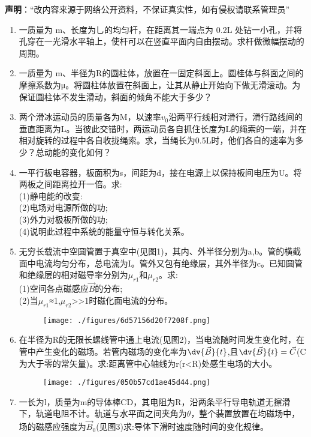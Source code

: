


\textbf{声明}：“改内容来源于网络公开资料，不保证真实性，如有侵权请联系管理员”

\begin{enumerate}
\item 一质量为 m、长度为乚的均匀杆，在距离其一端点为 0.2L 处钻一小孔，并将孔穿在一光滑水平轴上，使杆可以在竖直平面内自由摆动。求杆做微幅摆动的周期。
\item 一质量为 m、半径为R的圆柱体，放置在一固定斜面上。圆桂体与斜面之间的摩擦系数为μ。将圆柱体放置在斜面上，让其从静止开始向下做无滑滚动。为保证圆柱体不发生滑动，斜面的倾角不能大于多少？
\item 两个滑冰运动员的质量各为M，以速率$v_0$沿两平行线相对滑行，滑行路线间的垂直距离为L。当彼此交错时，两运动员各自抓住长度为L的绳索的一端，并在相对旋转的过程中各自收拢绳索。求，当绳长为0.5L时，他们各自的速率为多少？总动能的变化如何？
\item 一平行板电容器，板面积为s，间距为d，接在电源上以保持板间电压为U。将两板之间距离拉开一倍。求:\\(1)静电能的改变:\\(2)电场对电源所做的功;\\(3)外力对极板所做的功;\\(4)说明此过程中系统的能量守恒与转化关系。
\item 无穷长载流中空圆管置于真空中(见图1)，其内、外半径分别为a,b。管的横截面中电流均匀分布，总电流为I。管外又包有绝缘层，其外半径为c。已知圆管和绝缘层的相对磁导率分别为$\mu_{r1}$和$\mu_{r2}$。求:\\
(1)空间各点磁感应$\vec B$的分布;\\
(2)当$\mu_{r1}$≈1,$\mu_{r2}$>>1时磁化面电流的分布。
\begin{figure}[ht]
\centering
\texttt{[image: ./figures/6d57156d20f7208f.png]}
\caption{} \label{fig_SSD05_2}
\end{figure}
\item 在半径为R的无限长螺线管中通上电流(见图2)，当电流随时间发生变化时，在管中产生变化的磁场。若管内磁场的变化率为$\displaystyle \dv{\vec B}{t}$,且$\displaystyle \dv{\vec B}{t}=\vec C$(\vec C为大于零的常矢量)。求:距离管中心轴线为r(r<R)处感生电场的大小。
\begin{figure}[ht]
\centering
\texttt{[image: ./figures/050b57cd1ae45d44.png]}
\caption{} \label{fig_SSD05_4}
\end{figure}
\item 一长为l，质量为m的导体棒CD，其电阻为R，沿两条平行导电轨道无擦滑下，轨道电阻不计。轨道与水平面之间夹角为$\theta $，整个装置放置在均磁场中，场的磁感应强度为$\vec B_0$(见图3)求:导体下滑时速度随时间的变化规律。

\end{enumerate}
